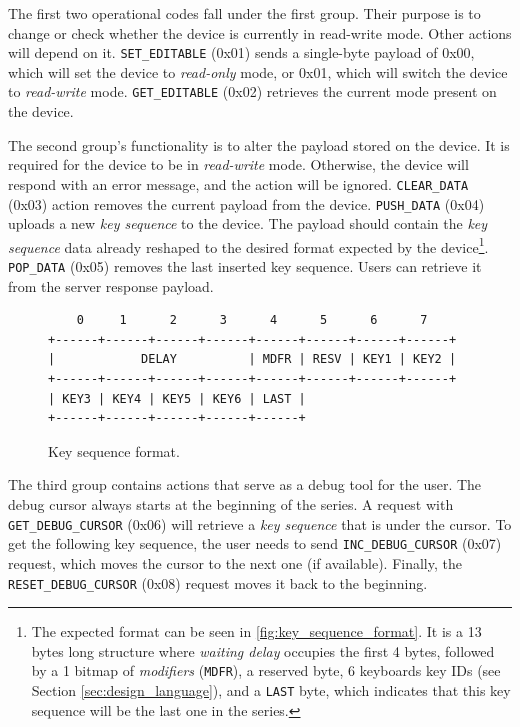 The first two operational codes fall under the first group. Their purpose is to change or check whether the device is currently in read-write mode. Other actions will depend on it. \verb|SET_EDITABLE| (0x01) sends a single-byte payload of 0x00, which will set the device to \emph{read-only} mode, or 0x01, which will switch the device to \emph{read-write} mode. \verb|GET_EDITABLE| (0x02) retrieves the current mode present on the device.

The second group's functionality is to alter the payload stored on the device. It is required for the device to be in \emph{read-write} mode. Otherwise, the device will respond with an error message, and the action will be ignored. \verb|CLEAR_DATA| (0x03) action removes the current payload from the device. \verb|PUSH_DATA| (0x04) uploads a new \emph{key sequence} to the device. The payload should contain the \emph{key sequence} data already reshaped to the desired format expected by the device\footnote{The expected format can be seen in \autoref{fig:key_sequence_format}. It is a 13 bytes long structure where \emph{waiting delay} occupies the first 4 bytes, followed by a 1 bitmap of \emph{modifiers} (\texttt{MDFR}), a reserved byte, 6 keyboards key IDs (see Section \ref{sec:design_language}), and a \texttt{LAST} byte, which indicates that this key sequence will be the last one in the series.}. \verb|POP_DATA| (0x05) removes the last inserted key sequence. Users can retrieve it from the server response payload.

\begin{figure}[ht]
\centering
\begin{varwidth}{\linewidth}
\begin{verbatim}
    0     1      2      3      4      5      6      7
+------+------+------+------+------+------+------+------+
|            DELAY          | MDFR | RESV | KEY1 | KEY2 |
+------+------+------+------+------+------+------+------+
| KEY3 | KEY4 | KEY5 | KEY6 | LAST |
+------+------+------+------+------+
\end{verbatim}
\end{varwidth}
\caption{Key sequence format.}
\label{fig:key_sequence_format}
\end{figure}

The third group contains actions that serve as a debug tool for the user. The debug cursor always starts at the beginning of the series. A request with \verb|GET_DEBUG_CURSOR| (0x06) will retrieve a \emph{key sequence} that is under the cursor. To get the following key sequence, the user needs to send \verb|INC_DEBUG_CURSOR| (0x07) request, which moves the cursor to the next one (if available). Finally, the \verb|RESET_DEBUG_CURSOR| (0x08) request moves it back to the beginning.

